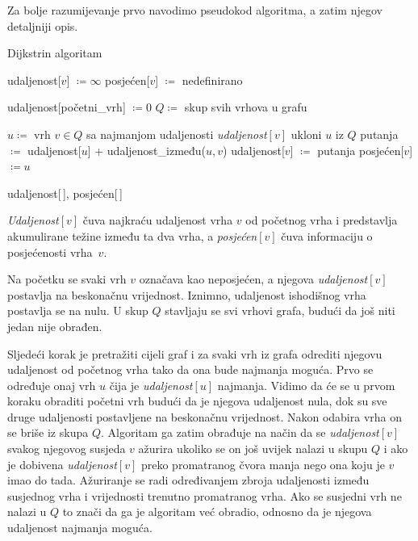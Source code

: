 \documentclass[10pt]{scrartcl}
\newenvironment{croatianalgorithm}[1][]
  {\begin{algorithm}[#1]
     \selectlanguage{croatian}%
     \floatname{algorithm}{Algoritam}%
     \renewcommand{\algorithmicif}{\textbf{ako}}%
     \renewcommand{\algorithmicthen}{\textbf{onda}}%
     \renewcommand{\algorithmicend}{\textbf{kraj}}%
     \renewcommand{\algorithmicwhile}{\textbf{sve dok}}%
     \renewcommand{\algorithmicdo}{\textbf{ponavljaj}}%
     \renewcommand{\algorithmicreturn}{\textbf{vrati}}%
     \renewcommand{\algorithmicendwhile}{\textbf{kraj sve dok}}%
     \renewcommand{\algorithmicfor}{\textbf{za svaki}}
     \renewcommand{\algorithmicendfor}{\textbf{kraj za svaki}}%
  }
  {\end{algorithm}}
\begin{document}
Za bolje razumijevanje prvo navodimo pseudokod algoritma, a zatim njegov detaljniji opis.

\begin{croatianalgorithm}[H]
  \caption{Dijkstrin algoritam}
  \begin{algorithmic}[1]
        \STATE udaljenost[$v$] $\coloneqq  \infty$
        \STATE posjećen[$v$] $\coloneqq$ nedefinirano
    \ENDFOR 
    \item[]
    \STATE udaljenost[početni\_vrh] $\coloneqq 0$
    \STATE $Q \coloneqq$ skup svih vrhova u grafu
    \item[]
        \STATE $u \coloneqq$ vrh $v \in Q$ sa najmanjom udaljenosti \emph{udaljenost$[v]$}
        \STATE ukloni $u$ iz $Q$
            \STATE putanja $\coloneqq$ udaljenost[$u$] + udaljenost\_između($u,v$)
                \STATE udaljenost[$v$] $\coloneqq$ putanja
                \STATE posjećen[$v$] $\coloneqq u$
            \ENDIF
        \ENDFOR
    \ENDWHILE
    \item[]
    \RETURN udaljenost[\,], posjećen[\,]
  \end{algorithmic}
\end{croatianalgorithm}


\emph{Udaljenost$[v]$} čuva najkraću udaljenost vrha $v$ od početnog vrha i predstavlja akumulirane težine između ta dva vrha, a \emph{posjećen$[v]$} čuva informaciju o posjećenosti vrha~$v$.

Na početku se svaki vrh $v$ označava kao neposjećen, a njegova \emph{udaljenost$[v]$} postavlja na beskonačnu vrijednost. Iznimno, udaljenost ishodišnog vrha postavlja se na nulu.
U skup $Q$ stavljaju se svi vrhovi grafa, budući da još niti jedan nije obrađen.

Sljedeći korak je pretražiti cijeli graf i za svaki vrh iz grafa odrediti njegovu udaljenost od početnog vrha tako da ona bude najmanja moguća.
Prvo se određuje onaj vrh $u$ čija je \emph{udaljenost$[u]$} najmanja. Vidimo da će se u prvom koraku obraditi početni vrh budući da je njegova udaljenost nula, dok su sve druge udaljenosti postavljene na beskonačnu vrijednost.
Nakon odabira vrha on se briše iz skupa $Q$. Algoritam ga zatim obrađuje na način da se \emph{udaljenost$[v]$} svakog njegovog susjeda $v$ ažurira ukoliko se on još uvijek nalazi u skupu $Q$ i ako je dobivena \emph{udaljenost$[v]$} preko promatranog čvora manja nego ona koju je $v$ imao do tada. Ažuriranje se radi određivanjem zbroja udaljenosti između susjednog vrha i vrijednosti trenutno promatranog vrha. Ako se susjedni vrh ne nalazi u $Q$ to znači da ga je algoritam već obradio, odnosno da je njegova udaljenost najmanja moguća. 
\end{document}
